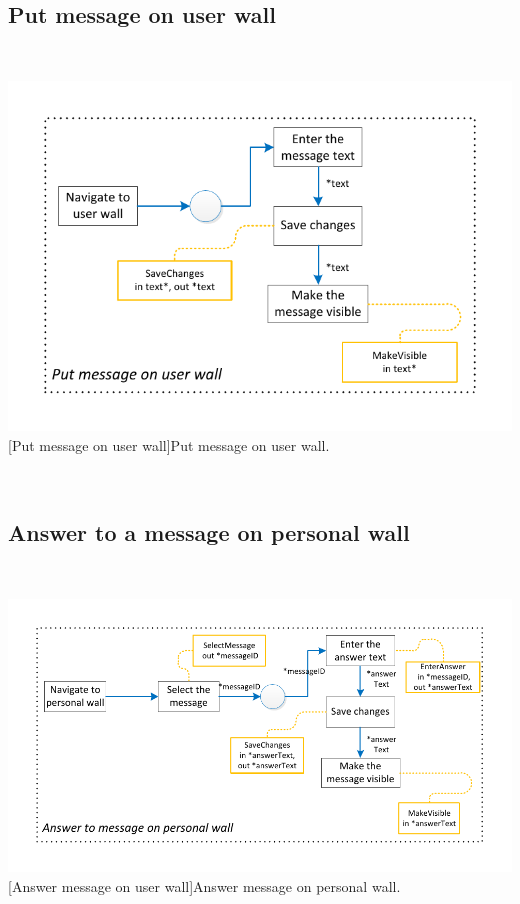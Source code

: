 \documentclass[11pt, a4paper,svglistings,oneside]{book}
\begin{document}
\subsection{Put message on user wall}

$\;$ \\
\noindent\begin{minipage}{\textwidth}
    \centering
   \includegraphics[scale=1]{nav_PutMessageOnUserWall.pdf}
 [Put message on user wall]{Put message on user wall.}
\end{minipage}
$\;$ \\ 

\subsection{Answer to a message on personal wall}

$\;$ \\
\noindent\begin{minipage}{\textwidth}
    \centering
   \includegraphics[scale=1]{nav_AnswerMessagePersonalWall.pdf}
 [Answer message on user wall]{Answer message on personal wall.}
\end{minipage}
$\;$ \\ 
\end{document}
